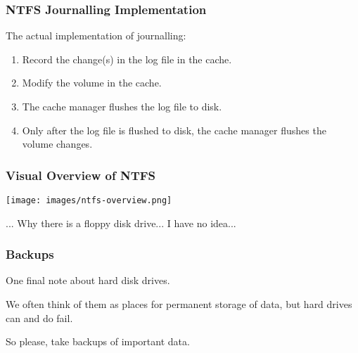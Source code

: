 \begin{frame}
\frametitle{NTFS Journalling Implementation}

The actual implementation of journalling:

\begin{enumerate}
	\item Record the change(s) in the log file in the cache.
	\item Modify the volume in the cache.
	\item The cache manager flushes the log file to disk.
	\item Only after the log file is flushed to disk, the cache manager flushes the volume changes.
\end{enumerate}

\end{frame}

\begin{frame}
\frametitle{Visual Overview of NTFS}
\begin{center}
	\texttt{[image: images/ntfs-overview.png]}
\end{center}

... Why there is a floppy disk drive... I have no idea...

\end{frame}

\begin{frame}
\frametitle{Backups}


One final note about hard disk drives.

We often think of them as places for permanent storage of data, but hard drives can and do fail. 

So please, take backups of important data.


\end{frame}



